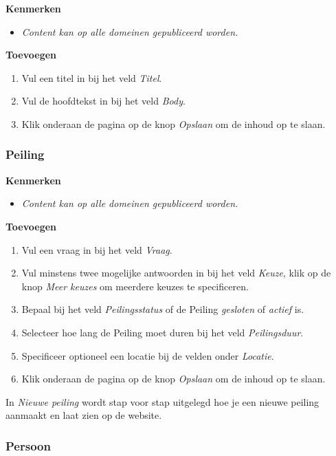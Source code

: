 \textbf{Kenmerken}

\begin{itemize}
\item \emph{Content kan op alle domeinen gepubliceerd worden.}
\end{itemize}

\textbf{Toevoegen}

\begin{enumerate}
\item Vul een titel in bij het veld \emph{Titel}.
\item Vul de hoofdtekst in bij het veld \emph{Body}.
\item Klik onderaan de pagina op de knop \emph{Opslaan} om de inhoud op te slaan.
\end{enumerate}

\subsubsection{Peiling}\label{peiling}

\textbf{Kenmerken}

\begin{itemize}
\item \emph{Content kan op alle domeinen gepubliceerd worden.}
\end{itemize}

\textbf{Toevoegen}

\begin{enumerate}
\item Vul een vraag in bij het veld \emph{Vraag}.
\item Vul minstens twee mogelijke antwoorden in bij het veld \emph{Keuze}, klik op de knop \emph{Meer keuzes} om meerdere keuzes te specificeren.
\item Bepaal bij het veld \emph{Peilingsstatus} of de Peiling \emph{gesloten} of \emph{actief} is.
\item Selecteer hoe lang de Peiling moet duren bij het veld \emph{Peilingsduur}.
\item Specificeer optioneel een locatie bij de velden onder \emph{Locatie}.
\item Klik onderaan de pagina op de knop \emph{Opslaan} om de inhoud op te slaan.
\end{enumerate}
In \emph{Nieuwe peiling} wordt stap voor stap uitgelegd hoe je een nieuwe peiling aanmaakt en laat zien op de website.

\subsubsection{Persoon}\label{persoon}

